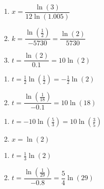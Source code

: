 \begin{multicols}{3}
\begin{enumerate}
\setcounter{enumi}{\value{HW}}

\item $x = \dfrac{\ln(3)}{12\ln(1.005)}$ 
\item $k = \dfrac{\ln\left(\frac{1}{2}\right)}{-5730} = \dfrac{\ln(2)}{5730} $
\item $t=\dfrac{\ln(2)}{0.1} = 10\ln(2)$ 

\setcounter{HW}{\value{enumi}}
\end{enumerate}
\end{multicols}

\begin{multicols}{2}
\begin{enumerate}
\setcounter{enumi}{\value{HW}}


\item $t=\frac{1}{2}\ln\left(\frac{1}{2}\right) = -\frac{1}{2}\ln(2)$ 
\item $t = \dfrac{\ln\left(\frac{1}{18}\right)}{-0.1} =10 \ln(18)$

\setcounter{HW}{\value{enumi}}
\end{enumerate}
\end{multicols}

\begin{multicols}{2}
\begin{enumerate}
\setcounter{enumi}{\value{HW}}


\item $t=-10\ln\left(\frac{5}{3}\right) = 10\ln\left(\frac{3}{5}\right)$
\item$x=\ln(2)$ 

\setcounter{HW}{\value{enumi}}
\end{enumerate}
\end{multicols}

\begin{multicols}{2}
\begin{enumerate}
\setcounter{enumi}{\value{HW}}

\item $t=\frac{1}{3}\ln(2)$ 

\item $t = \dfrac{\ln\left(\frac{1}{29}\right)}{-0.8} = \dfrac{5}{4}\ln(29)$

\setcounter{HW}{\value{enumi}}
\end{enumerate}
\end{multicols}

